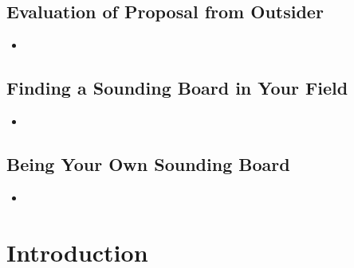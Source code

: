 \documentclass[11pt]{article}
\begin{document}
\subsection{Evaluation of Proposal from Outsider}
\begin{itemize}
\item \begin{exercise}
\end{exercise}
\end{itemize}
\subsection{Finding a Sounding Board in Your Field}
\begin{itemize}
\item \begin{exercise}
\end{exercise}
\end{itemize}
\subsection{Being Your Own Sounding Board}
\begin{itemize}
\item \begin{exercise}
\end{exercise}
\end{itemize}
\newpage
\section{Introduction}
\end{document}
